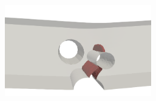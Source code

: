 \begin{frame}
\begin{columns}[T]
\begin{column}{0.6\textwidth}
\begin{figure}
{\begin{subfigure}{0.45\textwidth}
            \centering
            \includegraphics[width=0.7\textwidth]{Chapter345/figures/III}
          \end{subfigure}
        }
        
        \vspace{0.5em}
        

\end{figure}
\end{column}
\end{columns}
\end{frame}

